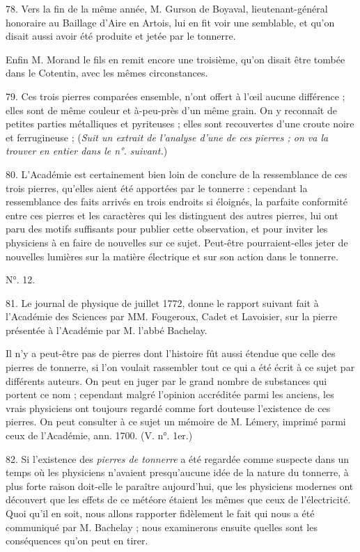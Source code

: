 \documentclass[a4paper, 11pt, oneside, polutonikogreek, french]{article}
\begin{document}
78. Vers la fin de la même année, M. Gurson de Boyaval, lieutenant-général honoraire au Baillage d'Aire en Artois, lui en fit voir une semblable, et qu'on disait aussi avoir été produite et jetée par le tonnerre.

Enfin M. Morand le fils en remit encore une troisième, qu'on disait être tombée dans le Cotentin, avec les mêmes circonstances.

79. Ces trois pierres comparées ensemble, n'ont offert à l'œil aucune différence ; elles sont de même couleur et à-peu-près d'un même grain. On y reconnaît de petites parties métalliques et pyriteuses ; elles sont recouvertes d'une croute noire et ferrugineuse ; (\emph{Suit un extrait de l'analyse d'une de ces pierres ; on va la trouver en entier dans le n°. suivant.})

80. L'Académie est certainement bien loin de conclure de la ressemblance de ces trois pierres, qu'elles aient été apportées par le tonnerre : cependant la ressemblance des faits arrivés en trois endroits si éloignés, la parfaite conformité entre ces pierres et les caractères qui les distinguent des autres pierres, lui ont paru des motifs suffisants pour publier cette observation, et pour inviter les physiciens à en faire de nouvelles sur ce sujet. Peut-être pourraient-elles jeter de nouvelles lumières sur la matière électrique et sur son action dans le tonnerre.

\begin{center}
N°. 12.
\end{center}

81. Le journal de physique de juillet 1772, donne le rapport suivant fait à l'Académie des Sciences par MM. Fougeroux, Cadet et Lavoisier, sur la pierre présentée à l'Académie par M. l'abbé Bachelay.

\og Il n'y a peut-être pas de pierres dont l'histoire fût aussi étendue que celle des pierres de tonnerre, si l'on voulait rassembler tout ce qui a été écrit à ce sujet par différents auteurs. On peut en juger par le grand nombre de substances qui portent ce nom ; cependant malgré l'opinion accréditée parmi les anciens, les vrais physiciens ont toujours regardé comme fort douteuse l'existence de ces pierres. On peut consulter à ce sujet un mémoire de M. Lémery, imprimé parmi ceux de l'Académie, ann. 1700. \fg (V. n°. 1er.)

82. Si l'existence des \emph{pierres de tonnerre} a été regardée comme suspecte dans un temps où les physiciens n'avaient presqu'aucune idée de la nature du tonnerre, à plus forte raison doit-elle le paraître aujourd'hui, que les physiciens modernes ont découvert que les effets de ce météore étaient les mêmes que ceux de l'électricité. Quoi qu'il en soit, nous allons rapporter fidèlement le fait qui nous a été communiqué par M. Bachelay ; nous examinerons ensuite quelles sont les conséquences qu'on peut en tirer.
\end{document}
